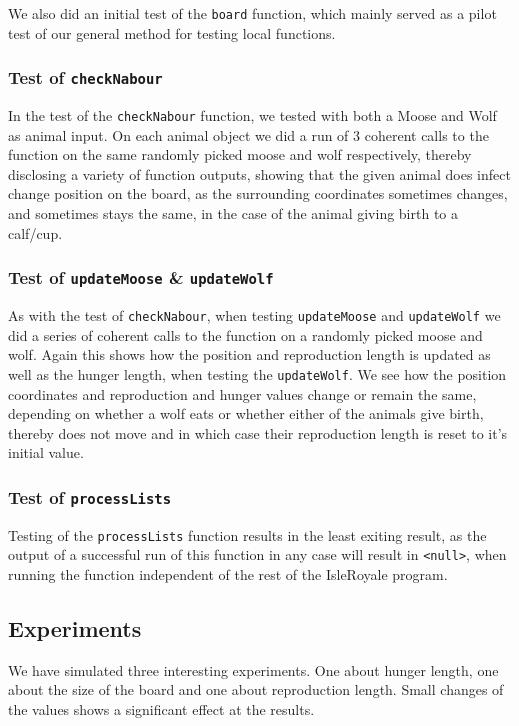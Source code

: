 \documentclass[a4paper]{report}
\begin{document}
We also did an initial test of the \texttt{board} function, which mainly served as a pilot test of our general method for testing local functions.

\subsubsection{Test of \texttt{checkNabour}}
In the test of the \texttt{checkNabour} function, we tested with both a Moose and Wolf as animal input. On each animal object we did a run of 3 coherent calls to the function on the same randomly picked moose and wolf respectively, thereby disclosing a variety of function outputs, showing that the given animal does infect change position on the board, as the surrounding coordinates sometimes changes, and sometimes stays the same, in the case of the animal giving birth to a calf/cup.

\subsubsection{Test of \texttt{updateMoose} \&  \texttt{updateWolf}}
As with the test of  \texttt{checkNabour}, when testing \texttt{updateMoose} and  \texttt{updateWolf} we did a series of coherent calls to the function on a randomly picked moose and wolf. Again this shows how the position and reproduction length is updated as well as the hunger length, when testing the \texttt{updateWolf}. We see how the position coordinates and reproduction and hunger values change or remain the same, depending on whether a wolf eats or whether either of the animals give birth, thereby does not move and in which case their reproduction length is reset to it’s initial value. 

\subsubsection{Test of \texttt{processLists}}
Testing of the \texttt{processLists} function results in the least exiting result, as the output of a successful run of this function in any case will result in \texttt{<null>}, when running the function 
independent of the rest of the IsleRoyale program.

\subsection*{Experiments}
We have simulated three interesting experiments. One about hunger length, one about the size of the board and one about reproduction length. Small changes of the values shows a significant effect at the results. 
\end{document}
